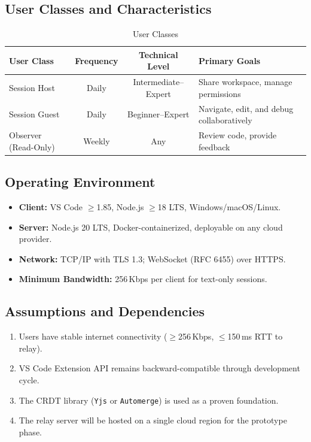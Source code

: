 \documentclass[12pt, a4paper, oneside]{article}
\begin{document}
\subsection{User Classes and Characteristics}
\begin{table}[H]
\centering
\caption{User Classes}
\begin{tabularx}{\textwidth}{l c c X}
\toprule
\textbf{User Class} & \textbf{Frequency} & \textbf{Technical Level} & \textbf{Primary Goals} \\
\midrule
Session Host    & Daily   & Intermediate--Expert & Share workspace, manage permissions \\
Session Guest   & Daily   & Beginner--Expert     & Navigate, edit, and debug collaboratively \\
Observer (Read-Only) & Weekly & Any            & Review code, provide feedback \\
\bottomrule
\end{tabularx}
\end{table}

\subsection{Operating Environment}
\begin{itemize}
  \item \textbf{Client:} VS Code $\geq$1.85, Node.js $\geq$18 LTS, Windows/macOS/Linux.
  \item \textbf{Server:} Node.js 20 LTS, Docker-containerized, deployable on any cloud provider.
  \item \textbf{Network:} TCP/IP with TLS 1.3; WebSocket (RFC 6455) over HTTPS.
  \item \textbf{Minimum Bandwidth:} 256\,Kbps per client for text-only sessions.
\end{itemize}

\subsection{Assumptions and Dependencies}
\begin{enumerate}
  \item Users have stable internet connectivity ($\geq$256\,Kbps, $\leq$150\,ms RTT to relay).
  \item VS Code Extension API remains backward-compatible through development cycle.
  \item The CRDT library (\texttt{Yjs} or \texttt{Automerge}) is used as a proven foundation.
  \item The relay server will be hosted on a single cloud region for the prototype phase.
\end{enumerate}
\end{document}
